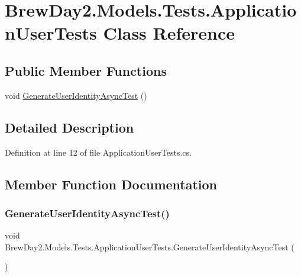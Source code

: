 \hypertarget{class_brew_day2_1_1_models_1_1_tests_1_1_application_user_tests}{}\section{Brew\+Day2.\+Models.\+Tests.\+Application\+User\+Tests Class Reference}
\label{class_brew_day2_1_1_models_1_1_tests_1_1_application_user_tests}
\subsection*{Public Member Functions}
\begin{DoxyCompactItemize}
\item 
void \mbox{\hyperlink{class_brew_day2_1_1_models_1_1_tests_1_1_application_user_tests_ac09de2759bc727d23f567603cfe329c2}{Generate\+User\+Identity\+Async\+Test}} ()
\end{DoxyCompactItemize}


\subsection{Detailed Description}


Definition at line 12 of file Application\+User\+Tests.\+cs.



\subsection{Member Function Documentation}
\mbox{\label{class_brew_day2_1_1_models_1_1_tests_1_1_application_user_tests_ac09de2759bc727d23f567603cfe329c2}} 
\subsubsection{\texorpdfstring{Generate\+User\+Identity\+Async\+Test()}{GenerateUserIdentityAsyncTest()}}
{\footnotesize\ttfamily void Brew\+Day2.\+Models.\+Tests.\+Application\+User\+Tests.\+Generate\+User\+Identity\+Async\+Test (\begin{DoxyParamCaption}{ }\end{DoxyParamCaption})}



